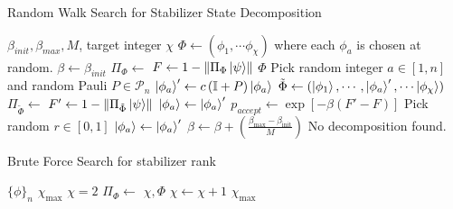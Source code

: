 \begin{algorithm}[p]
\caption{Random Walk Search for Stabilizer State Decomposition}
\label{alg:random_walk}
\begin{algorithmic}[1]
\Require $\beta_{init},\beta_{max},M$, target integer $\chi$
\Require {} 
\State $\Phi \leftarrow \left(\phi_{1},\cdots\phi_{\chi}\right)$ where each $\phi_{a}$ is chosen at random.
\State $\beta \leftarrow \beta_{init}$
        \State $\Pi_{\Phi}\gets$
        \State $F \gets 1-\norm{\Pi_{\Phi}\ket{\psi}}$
            \State \Return $\Phi$
        \EndIf
        \State Pick random integer $a\in[1,n]$ and random Pauli $P\in\mathcal{P}_{n}$
        \State $\ket{\phi_{a}}'\leftarrow c\left(\mathbb{I}+P\right)\ket{\phi_{a}}$ 
        \State $\tilde{\Phi} \leftarrow (\ket{\phi_{1}},\cdots,\ket{\phi_{a}}',\cdots\ket{\phi_{\chi}})$
        \State $\Pi_{\tilde{\Phi}}\gets$
        \State $F'\gets 1-\norm{\Pi_{\tilde{\Phi}}\ket{\psi}}$
            \State $\ket{\phi_{a}}\leftarrow \ket{\phi_{a}}'$
        \Else
            \State $p_{accept}\leftarrow \exp[-\beta\left(F'-F\right)]$
            \State Pick random $r\in [0,1]$
                \State $\ket{\phi_{a}}\leftarrow \ket{\phi_{a}}'$
            \EndIf
        \EndIf
    \EndFor
    \State $\beta\leftarrow \beta + \left( \frac{\beta_{\mathrm{max}}-\beta_{\mathrm{init}} }{M} \right)$
\EndWhile
\State \Return No decomposition found.
\end{algorithmic}
\end{algorithm}
\begin{algorithm}[p]
\caption{Brute Force Search for stabilizer rank}
\label{alg:brute_force}
\begin{algorithmic}[1]
    \Require $\{\phi\}_{n}$ 
    \Require $\chi_{\text{max}}$ 
    \Require {} 
    \State $\chi=2$
            \State $\Pi_{\Phi}\leftarrow$ 
                \State \Return $\chi,\Phi$
            \EndIf
        \EndFor
    \State $\chi\leftarrow \chi+1$
    \EndWhile
    \State \Return $\chi_{\text{max}}$ 
\end{algorithmic}
\end{algorithm}
